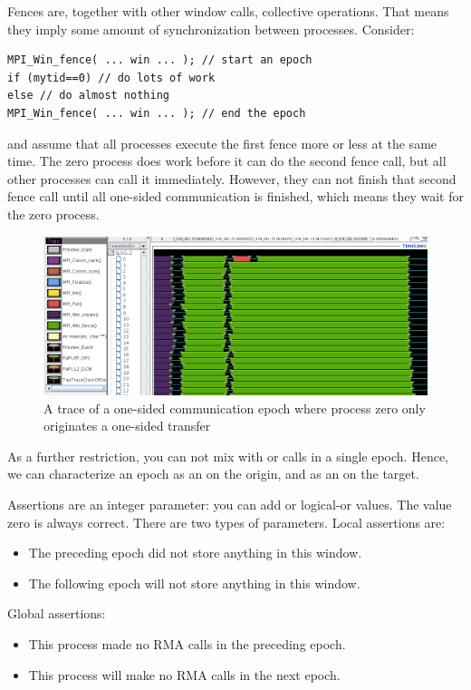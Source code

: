 Fences are, together with other window calls, collective operations. That means they 
imply some amount of synchronization between processes. Consider:
\begin{verbatim}
MPI_Win_fence( ... win ... ); // start an epoch
if (mytid==0) // do lots of work
else // do almost nothing
MPI_Win_fence( ... win ... ); // end the epoch
\end{verbatim}
and assume that all processes execute the first fence more or less at the same time.
The zero process does work before it can do the second fence call, but all other
processes can call it immediately. However, they can not finish that second fence call
until all one-sided communication is finished, which means they wait for the zero process.
\begin{figure}[ht]
  \includegraphics[scale=.4]{graphics-public/putblock}
  \caption{A trace of a one-sided communication epoch where process zero only originates
  a one-sided transfer}
  \label{fig:putblock}
\end{figure}

As a further restriction, you can not mix  with  or 
calls in a single epoch. Hence, we can characterize an epoch as an
 on the origin, and
as an  on the target.

Assertions are an integer parameter: you can add or logical-or values.
The value zero is always correct. There are two types of parameters.
Local assertions are:
\begin{itemize}
  \item{} The preceding epoch did not store
    anything in this window.
  \item{} The following epoch will not store
    anything in this window.
\end{itemize}
Global assertions:
\begin{itemize}
  \item{} This process made no \ac{RMA}
    calls in the preceding epoch.  
  \item{} This process will make no
    \ac{RMA} calls in the next epoch.
\end{itemize}


